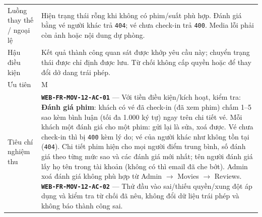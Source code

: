 \begin{longtable}{@{}P{0.23000\SRSWidth}P{0.77000\SRSWidth}@{}}
Luồng thay thế /\allowbreak{} ngoại lệ & Hiện trạng thái rỗng khi không có phim/\allowbreak{}suất phù hợp. Đánh giá bằng vé người khác trả \texttt{404}; vé chưa check-in trả \texttt{400}. Media lỗi phải còn ảnh hoặc nội dung dự phòng. \\[3pt]
Hậu điều kiện & Kết quả thành công quan sát được khớp yêu cầu này; chuyển trạng thái được chỉ định được lưu. Từ chối không cấp quyền hoặc để thay đổi dở dang trái phép. \\[3pt]
Ưu tiên & M \\[3pt]
Tiêu chí nghiệm thu & \textbf{\texttt{WEB-\allowbreak{}FR-\allowbreak{}MOV-\allowbreak{}12-\allowbreak{}AC-\allowbreak{}01}} — Với tiền điều kiện/\allowbreak{}kích hoạt, kiểm tra: \textbf{Đánh giá phim}: khách có vé đã check-in (đã xem phim) chấm 1–5 sao kèm bình luận (tối đa 1.000 ký tự) ngay trên chi tiết vé. Mỗi khách một đánh giá cho một phim: gửi lại là sửa, xoá được. Vé chưa check-in thì bị \texttt{400} kèm lý do; vé của người khác như không tồn tại (\texttt{404}). Chi tiết phim hiện cho mọi người điểm trung bình, số đánh giá theo từng mức sao và các đánh giá mới nhất; tên người đánh giá lấy họ tên trong tài khoản (không có thì email đã che bớt). Admin xoá đánh giá không phù hợp từ Admin \ensuremath{\rightarrow} Movies \ensuremath{\rightarrow} Reviews. \textbf{\texttt{WEB-\allowbreak{}FR-\allowbreak{}MOV-\allowbreak{}12-\allowbreak{}AC-\allowbreak{}02}} — Thử đầu vào sai/\allowbreak{}thiếu quyền/\allowbreak{}xung đột áp dụng và kiểm tra từ chối đã nêu, không đổi dữ liệu trái phép và không báo thành công sai. \\[3pt]

\end{longtable}
